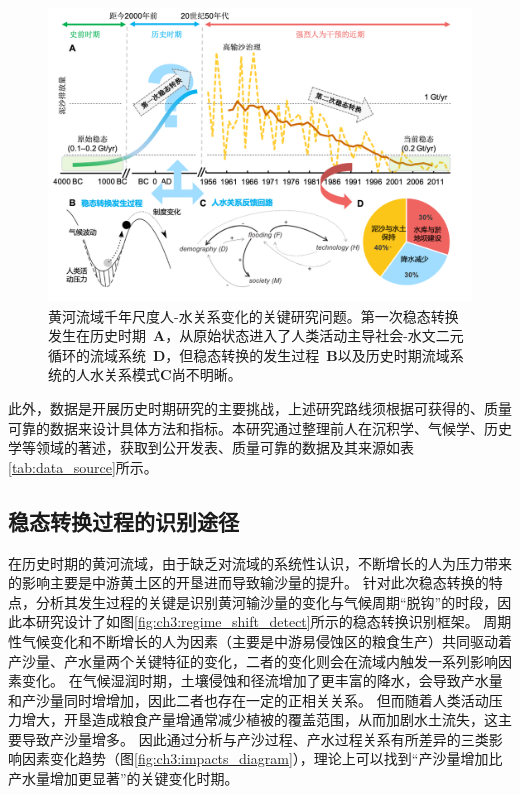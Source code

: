 \begin{figure}[!htb] %
    \centering
    \includegraphics[width=\textwidth]{img/ch3/ch3_why_regime_shift.png}
    \caption[黄河流域千年尺度人-水关系变化的关键研究问题]{黄河流域千年尺度人-水关系变化的关键研究问题。第一次稳态转换发生在历史时期~\textbf{A}，从原始状态进入了人类活动主导社会-水文二元循环的流域系统~\textbf{D}，但稳态转换的发生过程~\textbf{B}以及历史时期流域系统的人水关系模式\textbf{C}尚不明晰。}\label{fig:ch3:why_regime_shift}
\end{figure}

此外，数据是开展历史时期研究的主要挑战，上述研究路线须根据可获得的、质量可靠的数据来设计具体方法和指标。本研究通过整理前人在沉积学、气候学、历史学等领域的著述，获取到公开发表、质量可靠的数据及其来源如表\ref{tab:data_source}所示。




\subsection{稳态转换过程的识别途径}\label{sec:ch3:approach}

在历史时期的黄河流域，由于缺乏对流域的系统性认识，不断增长的人为压力带来的影响主要是中游黄土区的开垦进而导致输沙量的提升\cite{wu2020a}。
针对此次稳态转换的特点，分析其发生过程的关键是识别黄河输沙量的变化与气候周期“脱钩”的时段，因此本研究设计了如图\ref{fig:ch3:regime_shift_detect}所示的稳态转换识别框架。
周期性气候变化和不断增长的人为因素（主要是中游易侵蚀区的粮食生产）共同驱动着产沙量、产水量两个关键特征的变化，二者的变化则会在流域内触发一系列影响因素变化。
在气候湿润时期，土壤侵蚀和径流增加了更丰富的降水，会导致产水量和产沙量同时增增加，因此二者也存在一定的正相关关系。
但而随着人类活动压力增大，开垦造成粮食产量增通常减少植被的覆盖范围，从而加剧水土流失，这主要导致产沙量增多。
因此通过分析与产沙过程、产水过程关系有所差异的三类影响因素变化趋势（图\ref{fig:ch3:impacts_diagram}），理论上可以找到“产沙量增加比产水量增加更显著”的关键变化时期。

